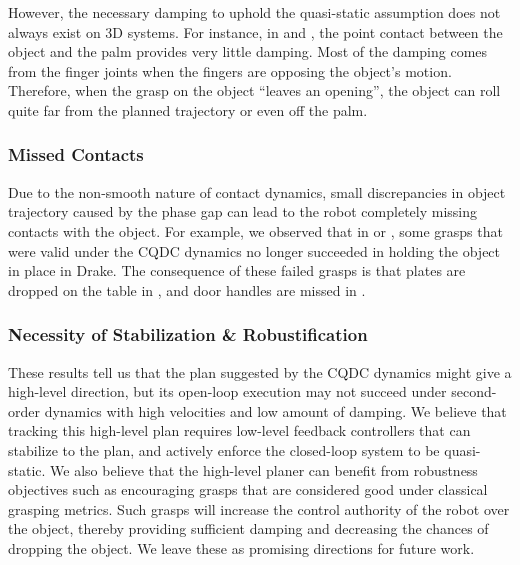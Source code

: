 However, the necessary damping to uphold the quasi-static assumption does not always exist on 3D systems. For instance, in  and , the point contact between the object and the palm provides very little damping. Most of the damping comes from the finger joints when the fingers are opposing the object's motion. Therefore, when the grasp on the object ``leaves an opening'', the object can roll quite far from the planned trajectory or even off the palm. 

\subsubsection{Missed Contacts}
Due to the non-smooth nature of contact dynamics, small discrepancies in object trajectory caused by the phase gap can lead to the robot completely missing contacts with the object. For example, we observed that in  or , some grasps that were valid under the CQDC dynamics no longer succeeded in holding the object in place in Drake. The consequence of these failed grasps is that plates are dropped on the table in , and door handles are missed in .


\subsubsection{Necessity of Stabilization \& Robustification}
These results tell us that the plan suggested by the CQDC dynamics might give a high-level direction, but its open-loop execution may not succeed under second-order dynamics with high velocities and low amount of damping. We believe that tracking this high-level plan requires low-level feedback controllers that can stabilize to the plan, and actively enforce the closed-loop system to be quasi-static. We also believe that the high-level planer can benefit from robustness objectives such as encouraging grasps that are considered good under classical grasping metrics. Such grasps will increase the control authority of the robot over the object, thereby providing sufficient damping and decreasing the chances of dropping the object. We leave these as promising directions for future work. 